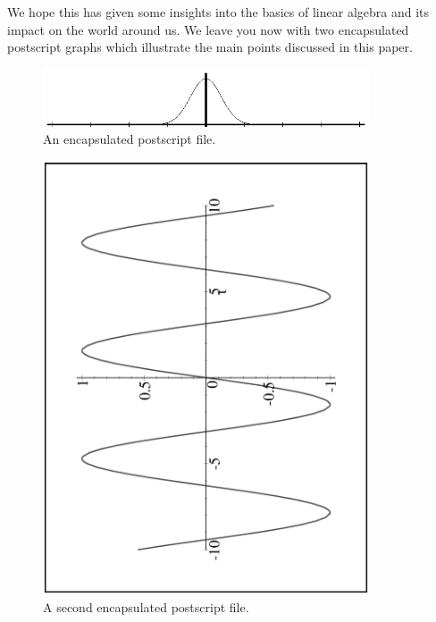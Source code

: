 We hope this has given some insights into the basics of linear
algebra and its impact on the world around us.  We leave you now
with two encapsulated postscript graphs which illustrate the
main points discussed in this paper.


\begin{figure}[h]   %
\begin{center}
\includegraphics[width=3.8in]{ch2-fg1.eps}
\caption{An encapsulated postscript file.}
\end{center}
\end{figure}


%
%


\begin{figure}[h]   %
\begin{center}
\includegraphics[width=3.8in,angle=270]{ch2-fg2.eps}
\caption{A second encapsulated postscript file.}
\end{center}
\end{figure}

